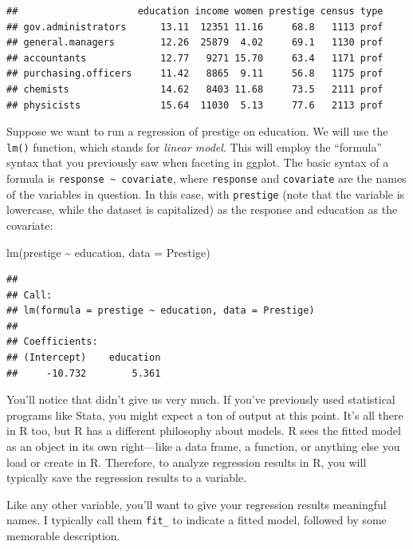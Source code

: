\documentclass[
  12pt,
  oneside,openany]{book}
\newenvironment{Shaded}{\begin{snugshade}}{\end{snugshade}}
\newcommand{\AttributeTok}[1]{\textcolor[rgb]{0.77,0.63,0.00}{#1}}
\newcommand{\FunctionTok}[1]{\textcolor[rgb]{0.00,0.00,0.00}{#1}}
\newcommand{\NormalTok}[1]{#1}
\newcommand{\SpecialCharTok}[1]{\textcolor[rgb]{0.00,0.00,0.00}{#1}}
\begin{document}
\begin{verbatim}
##                     education income women prestige census type
## gov.administrators      13.11  12351 11.16     68.8   1113 prof
## general.managers        12.26  25879  4.02     69.1   1130 prof
## accountants             12.77   9271 15.70     63.4   1171 prof
## purchasing.officers     11.42   8865  9.11     56.8   1175 prof
## chemists                14.62   8403 11.68     73.5   2111 prof
## physicists              15.64  11030  5.13     77.6   2113 prof
\end{verbatim}

Suppose we want to run a regression of prestige on education. We will use the \texttt{lm()} function, which stands for \emph{linear model}. This will employ the ``formula'' syntax that you previously saw when faceting in ggplot. The basic syntax of a formula is \texttt{response\ \textasciitilde{}\ covariate}, where \texttt{response} and \texttt{covariate} are the names of the variables in question. In this case, with \texttt{prestige} (note that the variable is lowercase, while the dataset is capitalized) as the response and education as the covariate:

\begin{Shaded}
\begin{Highlighting}[]
\FunctionTok{lm}\NormalTok{(prestige }\SpecialCharTok{\textasciitilde{}}\NormalTok{ education, }\AttributeTok{data =}\NormalTok{ Prestige)}
\end{Highlighting}
\end{Shaded}

\begin{verbatim}
## 
## Call:
## lm(formula = prestige ~ education, data = Prestige)
## 
## Coefficients:
## (Intercept)    education  
##     -10.732        5.361
\end{verbatim}

You'll notice that didn't give us very much. If you've previously used statistical programs like Stata, you might expect a ton of output at this point. It's all there in R too, but R has a different philosophy about models. R sees the fitted model as an object in its own right---like a data frame, a function, or anything else you load or create in R. Therefore, to analyze regression results in R, you will typically save the regression results to a variable.

Like any other variable, you'll want to give your regression results meaningful names. I typically call them \texttt{fit\_} to indicate a fitted model, followed by some memorable description.
\end{document}
